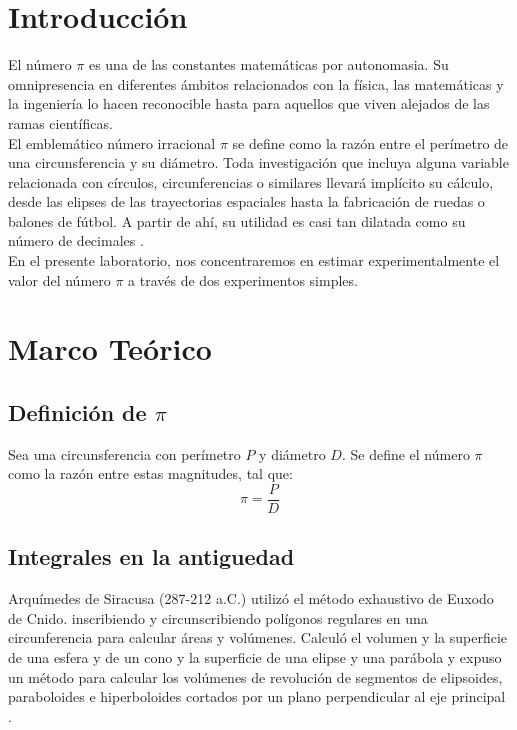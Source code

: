 \documentclass[10pt,a4paper]{article}
\begin{document}
	\begin{multicols}{2}
		\section{Introducción}
			El número $\pi$ es una de las constantes matemáticas por autonomasia. Su omnipresencia en diferentes ámbitos relacionados con la física, las matemáticas y la ingeniería lo hacen reconocible hasta para aquellos que viven alejados de las ramas científicas.\\
			
			El emblemático número irracional $\pi$ se define como la razón entre el perímetro de una circunsferencia y su diámetro. Toda investigación que incluya alguna variable relacionada con círculos, circunferencias o similares llevará implícito su cálculo, desde las elipses de las trayectorias espaciales hasta la fabricación de ruedas o balones de fútbol. A partir de ahí, su utilidad es casi tan dilatada como su número de decimales \cite{discovery}.\\
			
			En el presente laboratorio, nos concentraremos en estimar experimentalmente el valor del número $\pi$ a través de dos experimentos simples.
		\section{Marco Teórico}
		\subsection*{Definición de $\pi$}
		Sea una circunsferencia con perímetro $P$ y diámetro $D$. Se define el número $\pi$ como la razón entre estas magnitudes, tal que:
		\begin{equation}\label{def de pi}
		\pi = \frac{P}{D}
		\end{equation}
	
		\subsection*{Integrales en la antiguedad}
		Arquímedes de Siracusa (287-212 a.C.) utilizó el método exhaustivo de Euxodo de Cnido. inscribiendo y 	
circunscribiendo polígonos regulares en una circunferencia para calcular áreas y volúmenes. Calculó el volumen y la superficie de una esfera y de un cono y la superficie de una elipse y una parábola y expuso un método para calcular los volúmenes de revolución de segmentos de elipsoides, paraboloides e hiperboloides cortados por un
plano perpendicular al eje principal \cite{integrales}. \\


\end{multicols}
\end{document}
